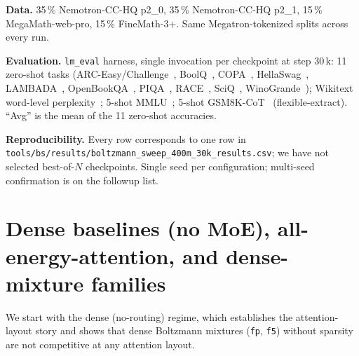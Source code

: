 \documentclass[oneside]{article}
\begin{document}
\textbf{Data.}
35\,\% Nemotron-CC-HQ p2\_0, 35\,\% Nemotron-CC-HQ p2\_1, 15\,\%
MegaMath-web-pro, 15\,\% FineMath-3+. Same Megatron-tokenized splits
across every run.

\textbf{Evaluation.}
\texttt{lm\_eval} harness, single invocation per checkpoint at step
30\,k: 11 zero-shot tasks (ARC-Easy/Challenge~\citep{clark2018think},
BoolQ~\citep{clark2019boolq}, COPA~\citep{roemmele2011choice},
HellaSwag~\citep{zellers2019hellaswag},
LAMBADA~\citep{paperno2016lambada},
OpenBookQA~\citep{mihaylov2018can},
PIQA~\citep{bisk2020piqa}, RACE~\citep{lai2017race},
SciQ~\citep{welbl2017crowdsourcing},
WinoGrande~\citep{sakaguchi2020winogrande});
Wikitext word-level perplexity~\citep{merity2017pointer}; 5-shot
MMLU~\citep{hendrycks2021measuring}; 5-shot
GSM8K-CoT~\citep{cobbe2021training} (flexible-extract). ``Avg'' is
the mean of the 11 zero-shot accuracies.

\textbf{Reproducibility.}
Every row corresponds to one row in
\texttt{tools/bs/results/boltzmann\_sweep\_400m\_30k\_results.csv}; we
have not selected best-of-$N$ checkpoints. Single seed per
configuration; multi-seed confirmation is on the followup list.


\section{Dense baselines (no MoE), all-energy-attention, and dense-mixture
families}
\label{sec:dense}

We start with the dense (no-routing) regime, which establishes the
attention-layout story and shows that dense Boltzmann mixtures
(\texttt{fp}, \texttt{f5}) without sparsity are not competitive at any
attention layout.
\end{document}
